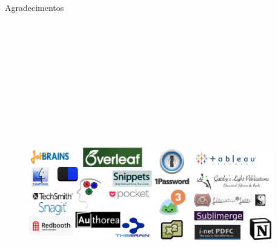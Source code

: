 \documentclass[final]{beamer}
\newlength{\sepmargin}
\newlength{\onecolwid}
\begin{document}
\begin{frame}[t]
\begin{columns}[t]
\begin{column}{\onecolwid}
 \begin{block}{Agradecimentos}
 \begin{figure}
 \vspace*{.4cm}
 \includegraphics[width=\linewidth, height=15cm]{agrdeco.png}
 \end{figure}
 \end{block}


\end{column}%
\begin{column}{\sepmargin} \end{column}
\end{columns}
\end{frame}
\end{document}
